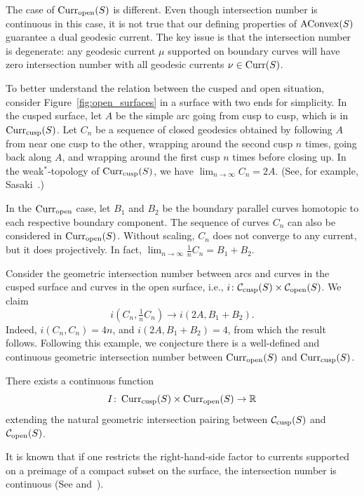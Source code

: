 The case of $\operatorname{Curr}_{\mathrm{open}}(S)$ is different. Even though intersection number is continuous in this case, it is not true that our defining properties of $\mathrm{AConvex}(S)$ guarantee a dual geodesic current.
The key issue is that the intersection number is degenerate: any
geodesic current $\mu$ supported on boundary curves will have zero
intersection number with all geodesic currents $\nu \in \operatorname{Curr}(S)$.

To better understand the relation between the cusped and open
situation, consider Figure~\ref{fig:open_surfaces} in a surface with
two ends for simplicity.
In the cusped surface, let $A$ be the simple arc going from cusp to cusp, which is in $\operatorname{Curr}_{\mathrm{cusp}}(S)$.
Let $C_n$ be a sequence of closed geodesics obtained by following $A$
from near one cusp to the other, wrapping around the second cusp $n$ times,
going back along $A$, and wrapping around the first cusp $n$ times
before closing up. In the weak$^*$-topology of
$\operatorname{Curr}_{\mathrm{cusp}}(S)$, we have $\lim_{n\to\infty}C_n = 2A$. (See, for example,
Sasaki~\cite[Section~6]{Sas22:Currents}.)

In the $\operatorname{Curr}_{\mathrm{open}}$ case, let $B_1$ and $B_2$ be the
boundary parallel curves homotopic to each respective boundary
component. The sequence of curves $C_n$ can also be considered in
$\operatorname{Curr}_{\mathrm{open}}(S)$. Without scaling, $C_n$ does not converge
to any current, but it does projectively. In fact, $\lim_{n \to
  \infty} \frac{1}{n} C_n = B_1 + B_2$.

Consider the geometric intersection number between arcs and curves in the cusped surface and curves in the open surface, i.e., $i \colon \mathcal{C}_{\mathrm{cusp}}(S) \times \mathcal{C}_{\mathrm{open}}(S)$.
We claim
\[
i(C_n, \tfrac{1}{n} C_n) \to i(2A, B_1 + B_2).
\]
Indeed, $i(C_n, C_n) = 4n$, and $i(2A, B_1+B_2)=4$, from which the result follows.
Following this example, we conjecture there is a well-defined and
continuous geometric intersection number between
$\operatorname{Curr}_{\mathrm{open}}(S)$ and $\operatorname{Curr}_{\mathrm{cusp}}(S)$.

\begin{conjecture}
There exists a continuous function 
\[
I \colon \operatorname{Curr}_{\mathrm{cusp}}(S) \times \operatorname{Curr}_{\mathrm{open}}(S) \to \mathbb{R}
\]
extending the natural geometric intersection pairing between $\mathcal{C}_{\mathrm{cusp}}(S)$ and $\mathcal{C}_{\mathrm{open}}(S)$.
\end{conjecture}

It is known that if one restricts the right-hand-side
factor to currents supported on a preimage of a compact subset on the
surface, the intersection number is continuous
(See \cite[Theorem~2.4]{BIPP21:Systoles}
and~\cite[Section~6]{Sas22:Currents}).

